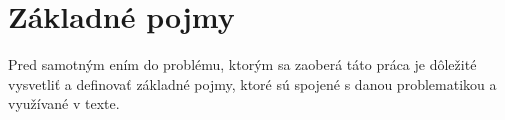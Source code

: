 \section{Základné pojmy}
Pred samotným ením do problému, ktorým sa zaoberá táto práca je dôležité vysvetliť a definovať základné pojmy, ktoré sú spojené s danou problematikou a využívané v texte.





